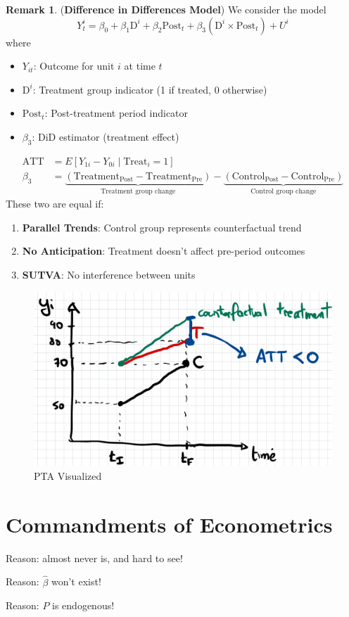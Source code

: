 \documentclass[10pt, oneside]{article}
\theoremstyle{definition}
\newtheorem{rem}{Remark}
\begin{document}
\begin{rem}
    (\textbf{Difference in Differences Model})
We consider the model 
\[Y^i_t = \beta_0 + \beta_1 \text{D}^i + \beta_2 \text{Post}_t + \beta_3 (\text{D}^i \times \text{Post}_t) + U^{i}\] where 
\begin{itemize}
    \item $Y_{it}$: Outcome for unit $i$ at time $t$
    \item $\text{D}^i$: Treatment group indicator (1 if treated, 0 otherwise)
    \item $\text{Post}_t$: Post-treatment period indicator
    \item $\beta_3$: DiD estimator (treatment effect)
\end{itemize}
\begin{align*}
\text{ATT} &= E[Y_{1i} - Y_{0i} \mid \text{Treat}_i = 1] \\
\beta_3 &= \underbrace{(\text{Treatment}_{\text{Post}} - \text{Treatment}_{\text{Pre}})}_{\text{Treatment group change}} - \underbrace{(\text{Control}_{\text{Post}} - \text{Control}_{\text{Pre}})}_{\text{Control group change}}
\end{align*}
These two are equal if:
\begin{enumerate}
    \item \textbf{Parallel Trends}: Control group represents counterfactual trend
    \item \textbf{No Anticipation}: Treatment doesn't affect pre-period outcomes
    \item \textbf{SUTVA}: No interference between units
\end{enumerate}
\begin{figure}[H]
    \centering
    \includegraphics[width=0.5\linewidth]{Images/DiD.png}
    \caption{PTA Visualized}
\end{figure}
\end{rem}


\section{Commandments of Econometrics}
Reason: almost never is, and hard to see!

Reason: $\hat\beta$ won't exist!

Reason: $P$ is endogenous!
\end{document}
